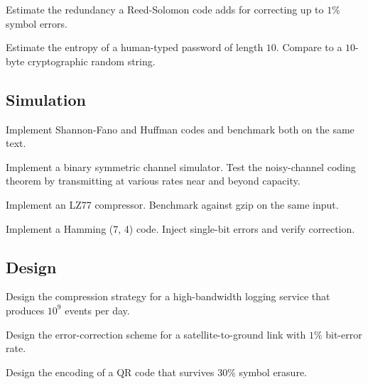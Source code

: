 \begin{exercise}
Estimate the redundancy a Reed-Solomon code adds for correcting up to $1\%$ symbol errors.
\end{exercise}

\begin{exercise}
Estimate the entropy of a human-typed password of length $10$. Compare to a $10$-byte cryptographic random string.
\end{exercise}

\subsection*{Simulation}

\begin{exercise}
Implement Shannon-Fano and Huffman codes and benchmark both on the same text.
\end{exercise}

\begin{exercise}
Implement a binary symmetric channel simulator. Test the noisy-channel coding theorem by transmitting at various rates near and beyond capacity.
\end{exercise}

\begin{exercise}
Implement an LZ77 compressor. Benchmark against gzip on the same input.
\end{exercise}

\begin{exercise}
Implement a Hamming (7, 4) code. Inject single-bit errors and verify correction.
\end{exercise}

\subsection*{Design}

\begin{exercise}
Design the compression strategy for a high-bandwidth logging service that produces $10^9$ events per day.
\end{exercise}

\begin{exercise}
Design the error-correction scheme for a satellite-to-ground link with $1\%$ bit-error rate.
\end{exercise}

\begin{exercise}
Design the encoding of a QR code that survives $30\%$ symbol erasure.
\end{exercise}

